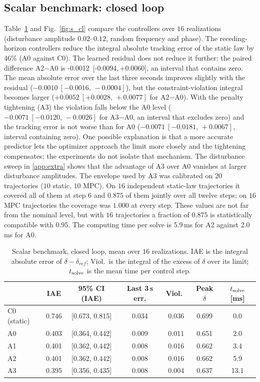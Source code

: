 \documentclass[preprint,12pt]{elsarticle}
\begin{document}
\subsection{Scalar benchmark: closed loop}
Table~\ref{tab:scalar_cl} and Fig.~\ref{fig:s_cl} compare the controllers over $16$ realizations (disturbance amplitude $0.02$--$0.12$, random frequency and phase). The receding-horizon controllers reduce the integral absolute tracking error of the static law by 46\% (A0 against C0). The learned residual does not reduce it further: the paired difference A2$-$A0 is -0.0012\ [-0.0094,\,+0.0060], an interval that contains zero. The mean absolute error over the last three seconds improves slightly with the residual ($-0.0010\ [-0.0016,\,-0.0004]$), but the constraint-violation integral becomes larger ($+0.0052\ [+0.0028,\,+0.0077]$ for A2$-$A0). With the penalty tightening (A3) the violation falls below the A0 level ($-0.0071\ [-0.0120,\,-0.0026]$ for A3$-$A0, an interval that excludes zero) and the tracking error is not worse than for A0 ($-0.0071\ [-0.0181,\,+0.0067]$, interval containing zero). One possible explanation is that a more accurate predictor lets the optimizer approach the limit more closely and the tightening compensates; the experiments do not isolate that mechanism. The disturbance sweep in \ref{app:extra} shows that the advantage of A3 over A0 vanishes at larger disturbance amplitudes. The envelope used by A3 was calibrated on $20$ trajectories ($10$ static, $10$ MPC). On $16$ independent static-law trajectories it covered all of them at step $6$ and $0.875$ of them jointly over all twelve steps; on $16$ MPC trajectories the coverage was $1.000$ at every step. These values are not far from the nominal level, but with $16$ trajectories a fraction of $0.875$ is statistically compatible with $0.95$. The computing time per solve is 5.9\,ms for A2 against 2.0\,ms for A0.
\begin{table}[!t]\centering\small
\caption{Scalar benchmark, closed loop, mean over $16$ realizations. IAE is the integral absolute error of $\delta-\delta_{ref}$; Viol.\ is the integral of the excess of $\delta$ over its limit; $t_{\rm solve}$ is the mean time per control step.}
\label{tab:scalar_cl}
\begin{tabular}{lcccccc}
\toprule
 & IAE & 95\% CI (IAE) & Last 3\,s err. & Viol.\ & Peak $\delta$ & $t_{\rm solve}$ [ms]\\
\midrule
C0 (static) & 0.746 & [0.673, 0.815] & 0.034 & 0.036 & 0.699 & 0.0\\
A0 & 0.403 & [0.364, 0.442] & 0.009 & 0.011 & 0.651 & 2.0\\
A1 & 0.401 & [0.362, 0.442] & 0.008 & 0.016 & 0.662 & 3.4\\
A2 & 0.401 & [0.362, 0.442] & 0.008 & 0.016 & 0.662 & 5.9\\
A3 & 0.395 & [0.356, 0.435] & 0.008 & 0.004 & 0.637 & 13.1\\
\bottomrule
\end{tabular}
\end{table}
\end{document}
